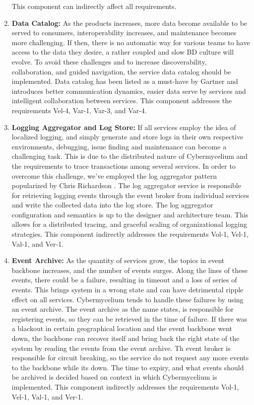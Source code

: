 \documentclass[review]{elsarticle}
\begin{document}
\begin{enumerate}
    This component can indirectly affect all requirements.

    \item \textbf{Data Catalog:} As the products increases, more data become available to be served to consumers, interoperability increases, and maintenance becomes more challenging. If then, there is no automatic way for various teams to have access to the data they desire, a rather coupled and slow BD culture will evolve. To avoid these challenges and to increase discoverability, collaboration, and guided navigation, the service data catalog should be implemented. Data catalog has been listed as a must-have by Gartner \cite{GartnerDataCatalog} and introduces better communication dynamics, easier data serve by services and intelligent collaboration between services. This component addresses the requirements Vel-4, Var-1, Var-3, and Var-4.
    
    \item \textbf{Logging Aggregator and Log Store:} If all services employ the idea of localized logging, and simply generate and store logs in their own respective environments, debugging, issue finding and maintenance can become a challenging task. This is due to the distributed nature of Cybermycelium and the requirements to trace transactions among several services. In order to overcome this challenge, we've employed the log aggregator pattern popularized by Chris Richardson \cite{MicroServicesPatterns}. The log aggregator service is responsible for retrieving logging events through the event broker from individual services and write the collected data into the log store. The log aggregator configuration and semantics is up to the designer and architecture team. This allows for a distributed tracing, and graceful scaling of organizational logging strategies. This component indirectly addresses the requirements Vol-1, Vel-1, Val-1, and Ver-1.

    \item \textbf{Event Archive:} As the quantity of services grow, the topics in event backbone increases, and the number of events surges. Along the lines of these events, there could be a failure, resulting in timeout and a loss of series of events. This brings system in a wrong state and can have detrimental ripple effect on all services. Cybermycelium tends to handle these failures by using an event archive. The event archive as the name states, is responsible for registering events, so they can be retrieved in the time of failure. If there was a blackout in certain geographical location and the event backbone went down, the backbone can recover itself and bring back the right state of the system by reading the events from the event archive. Th event broker is responsible for circuit breaking, so the service do not request any more events to the backbone while its down. The time to expiry, and what events should be archived is decided based on context in which Cybermycelium is implemented. This component indirectly addresses
    the requirements Vol-1, Vel-1, Val-1, and Ver-1.


\end{enumerate}
\end{document}
